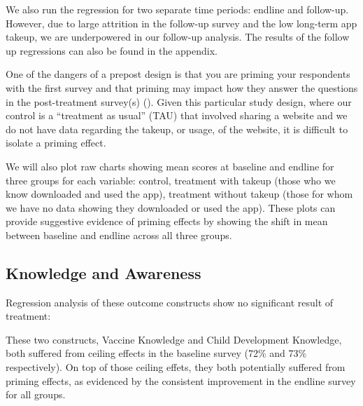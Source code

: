 \documentclass{article}
\begin{document}
We also run the regression for two separate time periods: endline and follow-up. However, due to large attrition in the follow-up survey and the low long-term app takeup, we are underpowered in our follow-up analysis. The results of the follow up regressions can also be found in the appendix.

One of the dangers of a prepost design is that you are priming your respondents with the first survey and that priming may impact how they answer the questions in the post-treatment survey(s) (\cite{Stantcheva2023}). Given this particular study design, where our control is a ``treatment as usual'' (TAU) that involved sharing a website and we do not have data regarding the takeup, or usage, of the website, it is difficult to isolate a priming effect.

We will also plot raw charts showing mean scores at baseline and endline for three groups for each variable: control, treatment with takeup (those who we know downloaded and used the app), treatment without takeup (those for whom we have no data showing they downloaded or used the app). These plots can provide suggestive evidence of priming effects by showing the shift in mean between baseline and endline across all three groups.

\subsection*{Knowledge and Awareness}

Regression analysis of these outcome constructs show no significant result of treatment:



These two constructs, Vaccine Knowledge and Child Development Knowledge, both suffered from ceiling effects in the baseline survey (72\% and 73\% respectively). On top of those ceiling effets, they both potentially suffered from priming effects, as evidenced by the consistent improvement in the endline survey for all groups.
\end{document}
